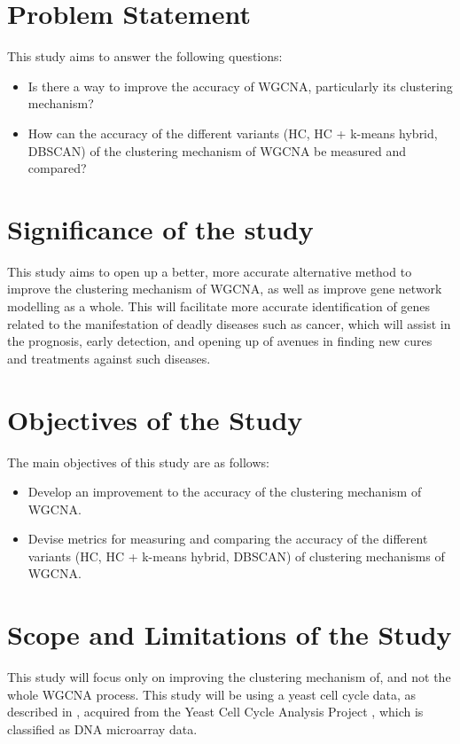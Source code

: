\documentclass[sigconf,authordraft]{acmart}
\begin{document}
\section{Problem Statement}

This study aims to answer the following questions:
\begin{itemize}
	\item Is there a way to improve the accuracy of WGCNA, particularly its clustering mechanism?

	\item How can the accuracy of the different variants (HC, HC + k-means hybrid, DBSCAN) of the clustering mechanism of WGCNA be measured and compared?
\end{itemize}

\section{Significance of the study}

This study aims to open up a better, more accurate alternative method to improve the clustering mechanism of WGCNA, as well as improve gene network modelling as a whole. This will facilitate more accurate identification of genes related to the manifestation of deadly diseases such as cancer, which will assist in the prognosis, early detection, and opening up of avenues in finding new cures and treatments against such diseases.

\section{Objectives of the Study}

The main objectives of this study are as follows:
\begin{itemize}
	\item Develop an improvement to the accuracy of the clustering mechanism of WGCNA.

	\item Devise metrics for measuring and comparing the accuracy of the different variants (HC, HC + k-means hybrid, DBSCAN) of clustering mechanisms of WGCNA.

\end{itemize}

\section{Scope and Limitations of the Study}

This study will focus only on improving the clustering mechanism of, and not the whole WGCNA process. This study will be using a yeast cell cycle data, as described in \cite{ChoEtal1998}, acquired from the Yeast Cell Cycle Analysis Project \cite{SpellmanEtal1998}, which is classified as DNA microarray data.
\end{document}
